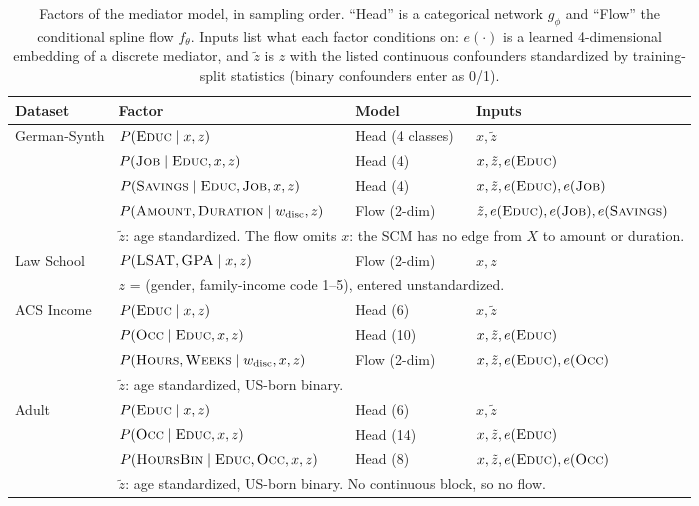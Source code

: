 \begin{table}[t]
\centering
\small
\caption{Factors of the mediator model, in sampling order. ``Head'' is a
categorical network $g_\phi$ and ``Flow'' the conditional spline flow
$f_\theta$. Inputs list what each factor conditions on: $e(\cdot)$ is a
learned 4-dimensional embedding of a discrete mediator, and $\tilde z$ is $z$
with the listed continuous confounders standardized by training-split
statistics (binary confounders enter as 0/1).}
\label{tab:factors}
\setlength{\tabcolsep}{4pt}
\begin{tabular}{llll}
\hline
Dataset & Factor & Model & Inputs \\
\hline
German-Synth & $P(\textsc{Educ}\mid x,z)$ & Head (4 classes) & $x,\tilde z$ \\
 & $P(\textsc{Job}\mid \textsc{Educ},x,z)$ & Head (4) & $x,\tilde z,e(\textsc{Educ})$ \\
 & $P(\textsc{Savings}\mid \textsc{Educ},\textsc{Job},x,z)$ & Head (4) & $x,\tilde z,e(\textsc{Educ}),e(\textsc{Job})$ \\
 & $P(\textsc{Amount},\textsc{Duration}\mid w_{\mathrm{disc}},z)$ & Flow (2-dim) & $\tilde z,e(\textsc{Educ}),e(\textsc{Job}),e(\textsc{Savings})$ \\
 & \multicolumn{3}{l}{\quad $\tilde z$: age standardized. The flow omits $x$: the SCM has no edge from $X$ to amount or duration.} \\
\hline
Law School & $P(\textsc{LSAT},\textsc{GPA}\mid x,z)$ & Flow (2-dim) & $x,z$ \\
 & \multicolumn{3}{l}{\quad $z$ = (gender, family-income code 1--5), entered unstandardized.} \\
\hline
ACS Income & $P(\textsc{Educ}\mid x,z)$ & Head (6) & $x,\tilde z$ \\
 & $P(\textsc{Occ}\mid \textsc{Educ},x,z)$ & Head (10) & $x,\tilde z,e(\textsc{Educ})$ \\
 & $P(\textsc{Hours},\textsc{Weeks}\mid w_{\mathrm{disc}},x,z)$ & Flow (2-dim) & $x,\tilde z,e(\textsc{Educ}),e(\textsc{Occ})$ \\
 & \multicolumn{3}{l}{\quad $\tilde z$: age standardized, US-born binary.} \\
\hline
Adult & $P(\textsc{Educ}\mid x,z)$ & Head (6) & $x,\tilde z$ \\
 & $P(\textsc{Occ}\mid \textsc{Educ},x,z)$ & Head (14) & $x,\tilde z,e(\textsc{Educ})$ \\
 & $P(\textsc{HoursBin}\mid \textsc{Educ},\textsc{Occ},x,z)$ & Head (8) & $x,\tilde z,e(\textsc{Educ}),e(\textsc{Occ})$ \\
 & \multicolumn{3}{l}{\quad $\tilde z$: age standardized, US-born binary. No continuous block, so no flow.} \\
\hline
\end{tabular}
\end{table}

